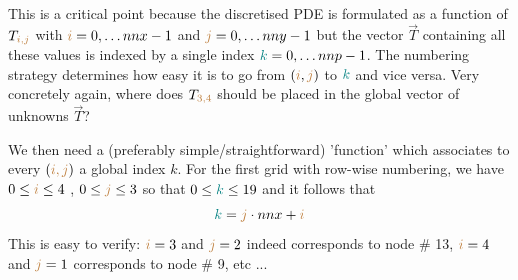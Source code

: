 \begin{minipage}[t]{\textwidth}
\\
\end{minipage}

\vspace{.5cm}

This is a critical point because the discretised PDE is formulated as a function of $T_{{\color{brown} i,j}}$ 
with ${\color{brown}i}=0,\dots nnx-1$ and ${\color{brown}j}=0,\dots nny-1$ 
but the vector $\vec{T}$ containing all these values
is indexed by a single index ${\color{teal}k}=0,\dots nnp-1$. The numbering strategy determines how easy
it is to go from $({\color{brown}i},{\color{brown}j})$ to ${\color{teal}k}$ and vice versa. 
Very concretely again, where does $T_{\color{brown}3,4}$ should be placed in the global 
vector of unknowns $\vec{T}$?

We then need a (preferably simple/straightforward) 'function' 
which associates to every $({\color{brown} i,j})$ a global index $k$. 
For the first grid with row-wise numbering, we have 
$0\leq {\color{brown}i} \leq 4$ , $0 \leq {\color{brown}j} \leq 3$ 
so that $0 \leq {\color{teal}k} \leq 19$
and it follows that 
\begin{equation}
{\color{teal} k}={\color{brown}j} \cdot nnx+{\color{brown}i}
\end{equation}
This is easy to verify: ${\color{brown}i}=3$ and ${\color{brown}j}=2$ 
indeed corresponds to node \# 13, 
${\color{brown}i}=4$ and ${\color{brown}j}=1$ corresponds to node \# 9, etc ...

\begin{minipage}[t]{\textwidth}
\begin{center}

\end{center}
\end{minipage}





